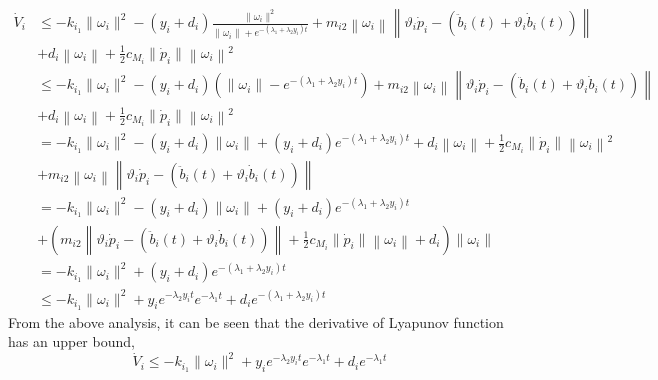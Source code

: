    \begin{equation*}
       \begin{align}
           \dot{V}_i &\leq -k_{i_1} \lVert \omega_i \rVert^2 - (y_i + d_i)\frac{\lVert \omega_i \rVert^2}{\lVert \omega_i \rVert + e^{-\left(\lambda_1 + \lambda_2 y_i\right)t}}  + m_{i2} \left\lVert \omega_i \right\rVert \left \lVert \vartheta_i\dot{p}_i - (\ddot{b}_i(t) + \vartheta_i \dot{b}_i(t)) \right\rVert\\
            &+  d_i\left\lVert \omega_i \right\rVert +\frac{1}{2}c_{M_i} \lVert \dot{p}_i \rVert\left\lVert \omega_i \right\rVert^2\\
            &\leq -k_{i_1} \lVert \omega_i \rVert^2 - (y_i + d_i)\left(\lVert \omega_i \rVert - e^{-(\lambda_1 + \lambda_2 y_i)t}\right)  + m_{i2} \left\lVert \omega_i \right\rVert \left \lVert \vartheta_i\dot{p}_i - (\ddot{b}_i(t) + \vartheta_i \dot{b}_i(t)) \right\rVert\\
            & + d_i\left\lVert \omega_i \right\rVert +\frac{1}{2}c_{M_i} \lVert \dot{p}_i \rVert\left\lVert \omega_i \right\rVert^2\\
            &= -k_{i_1} \lVert \omega_i \rVert^2 - (y_i + d_i)\lVert \omega_i \rVert + (y_i + d_i)e^{-(\lambda_1 + \lambda_2 y_i)t}+ d_i\left\lVert \omega_i \right\rVert +\frac{1}{2}c_{M_i} \lVert \dot{p}_i \rVert\left\lVert \omega_i \right\rVert^2\\ 
            &+ m_{i2} \left\lVert \omega_i \right\rVert \left \lVert \vartheta_i\dot{p}_i - (\ddot{b}_i(t) + \vartheta_i \dot{b}_i(t)) \right\rVert\\
            &= -k_{i_1} \lVert \omega_i \rVert^2 - (y_i + d_i)\lVert \omega_i \rVert + (y_i + d_i)e^{-(\lambda_1 + \lambda_2 y_i)t}\\
            &+ \left(m_{i2}\left \lVert \vartheta_i\dot{p}_i - (\ddot{b}_i(t) + \vartheta_i \dot{b}_i(t)) \right\rVert + \frac{1}{2}c_{M_i} \lVert \dot{p}_i \rVert\left\lVert \omega_i \right\rVert+ d_i \right)\lVert \omega_i \rVert\\
            &= -k_{i_1} \lVert \omega_i \rVert^2 + (y_i + d_i)e^{-(\lambda_1 + \lambda_2 y_i)t}\\
            &\leq -k_{i_1} \lVert \omega_i \rVert^2 + y_ie^{-\lambda_2 y_i t} e^{-\lambda_1 t} + d_ie^{-(\lambda_1 + \lambda_2 y_i)t}
       \end{align}
   \end{equation*}
   From the above analysis, it can be seen that the derivative of Lyapunov function has an upper bound,
    \begin{equation}\label{eq:4.2.11}
        \dot{V}_i \leq -k_{i_1} \lVert \omega_i \rVert^2 + y_ie^{-\lambda_2 y_i t} e^{-\lambda_1 t} + d_ie^{-\lambda_1 t}
    \end{equation}

